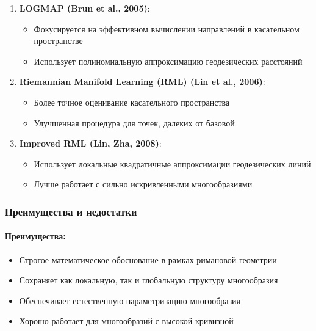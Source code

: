\documentclass[a4paper,12pt]{article}
\begin{document}
\begin{enumerate}
    \item \textbf{LOGMAP (Brun et al., 2005)}:
    \begin{itemize}
        \item Фокусируется на эффективном вычислении направлений в касательном пространстве
        \item Использует полиномиальную аппроксимацию геодезических расстояний
    \end{itemize}

    \item \textbf{Riemannian Manifold Learning (RML) (Lin et al., 2006)}:
    \begin{itemize}
        \item Более точное оценивание касательного пространства
        \item Улучшенная процедура для точек, далеких от базовой
    \end{itemize}

    \item \textbf{Improved RML (Lin, Zha, 2008)}:
    \begin{itemize}
        \item Использует локальные квадратичные аппроксимации геодезических линий
        \item Лучше работает с сильно искривленными многообразиями
    \end{itemize}
\end{enumerate}

\subsubsection{Преимущества и недостатки}

\paragraph{Преимущества:}
\begin{itemize}
    \item Строгое математическое обоснование в рамках римановой геометрии
    \item Сохраняет как локальную, так и глобальную структуру многообразия
    \item Обеспечивает естественную параметризацию многообразия
    \item Хорошо работает для многообразий с высокой кривизной
\end{itemize}
\end{document}
